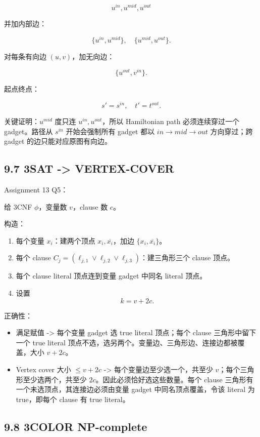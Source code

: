 ﻿\documentclass[UTF8,11pt]{ctexart}
\begin{document}
\[
u^{in},u^{mid},u^{out}
\]

并加内部边：

\[
\{u^{in},u^{mid}\},\quad \{u^{mid},u^{out}\}.
\]

对每条有向边 \((u,v)\)，加无向边：

\[
\{u^{out},v^{in}\}.
\]

起点终点：

\[
s'=s^{in},\quad t'=t^{out}.
\]


关键证明：\(u^{mid}\) 度只连 \(u^{in},u^{out}\)，所以 Hamiltonian path 必须连续穿过一个 gadget。路径从 \(s^{in}\) 开始会强制所有 gadget 都以 \(in\to mid\to out\) 方向穿过；跨 gadget 的边只能对应原图有向边。


\subsection{9.7 3SAT -> VERTEX-COVER}


Assignment 13 Q5：


给 3CNF \(\phi\)，变量数 \(v\)，clause 数 \(c\)。


构造：


\begin{enumerate}
\item 每个变量 \(x_i\)：建两个顶点 \(x_i,\overline{x_i}\)，加边 \(\{x_i,\overline{x_i}\}\)。
\item 每个 clause \(C_j=(\ell_{j,1}\vee\ell_{j,2}\vee\ell_{j,3})\)：建三角形三个 clause 顶点。
\item 每个 clause literal 顶点连到变量 gadget 中同名 literal 顶点。
\item 设置
\[
   k=v+2c.
   \]

\end{enumerate}


正确性：


\begin{itemize}
\item 满足赋值 -> 每个变量 gadget 选 true literal 顶点；每个 clause 三角形中留下一个 true literal 顶点不选，选另两个。变量边、三角形边、连接边都被覆盖，大小 \(v+2c\)。
\item Vertex cover 大小 \(\le v+2c\) -> 每个变量边至少选一个，共至少 \(v\)；每个三角形至少选两个，共至少 \(2c\)。因此必须恰好选这些数量。每个 clause 三角形有一个未选顶点，其连接边必须由变量 gadget 中同名顶点覆盖，令该 literal 为 true，即每个 clause 有 true literal。
\end{itemize}


\subsection{9.8 3COLOR NP-complete}
\end{document}
